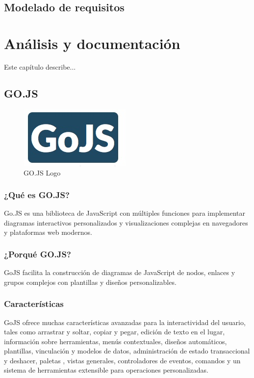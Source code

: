 \documentclass[a4paper,12pt]{book}
\begin{document}
	
		\section{Modelado de requisitos}
	

	
	
	\afterpage{\null\newpage}
	\newpage
	

	 \chapter{Análisis y documentación}
	 Este capítulo describe...
	 
	 \minitoc
	 
	 	\section{GO.JS}
	 		
	 		
	 		\begin{figure}[h]
	 			\centering
	 			\includegraphics[scale=1]{gojs.jpeg}
	 			\caption{GO.JS Logo}\label{fig:gojs}
	 		\end{figure}
	 	
	 	
	 		\subsection{¿Qué es GO.JS?}
	 			Go.JS \cite{gojs} es una biblioteca de JavaScript con múltiples funciones para implementar diagramas interactivos personalizados y visualizaciones complejas en navegadores y plataformas web modernos.
	 	
	 		\subsection{¿Porqué GO.JS?}
	 		 GoJS facilita la construcción de diagramas de JavaScript de nodos, enlaces y grupos complejos con plantillas y diseños personalizables.
	 		
	 		
	 		\subsection{Características}
	 		GoJS ofrece muchas características avanzadas para la interactividad del usuario, tales como arrastrar y soltar, copiar y pegar, edición de texto en el lugar, información sobre herramientas, menús contextuales, diseños automáticos, plantillas, vinculación y modelos de datos, administración de estado transaccional y deshacer, paletas , vistas generales, controladores de eventos, comandos y un sistema de herramientas extensible para operaciones personalizadas.
	 		
\end{document}
